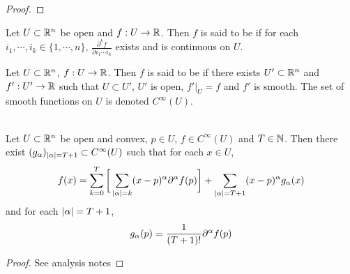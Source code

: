 \documentclass{book}
\begin{document}
	\begin{proof}
		
	\end{proof}

	\begin{defn} 
		Let $U \subset \mathbb{R}^n$ be open and $f: U \rightarrow \mathbb{R}$. Then $f$ is said to be  if for each $i_1, \cdots, i_k \in \{1, \cdots, n\}$, $\frac{\partial^k f}{\partial i_1 \cdots i_k}$ exists and is continuous on $U$.
	\end{defn}

	\begin{defn} 
		Let $U \subset \mathbb{R}^n$, $f: U \rightarrow \mathbb{R}$. Then $f$ is said to be  if there exists $U' 
		\subset \mathbb{R}^n$ and $f':U' \rightarrow \mathbb{R}$ such that $U \subset U'$, $U'$ is open, $f'|_U = f$ and $f'$ is smooth. The set of smooth functions on $U$ is denoted $C^{\infty}(U)$.
	\end{defn}


	\begin{thm} \\  
		Let $U \subset \mathbb{R}^n$ be open and convex, $p \in U$, $f \in C^{\infty}(U)$ and $T \in \mathbb{N}$. Then there exist $(g_{\alpha})_{|\alpha| = T+1} \subset C^{\infty}(U)$ such that for each $x \in U$, 
		$$f(x) = \sum_{k=0}^{T} \bigg[\sum_{|\alpha| = k}(x - p)^{\alpha} \partial^{\alpha} f (p) \bigg] + \sum_{|\alpha| = T+1}(x - p)^{\alpha} g_{\alpha}(x)$$ and for each $|\alpha|= T+1$, $$g_{\alpha}(p) = \frac{1}{(T+1)!}\partial^{\alpha} f(p)$$
	\end{thm}
	
	\begin{proof}
	See analysis notes
	\end{proof}

\end{document}

